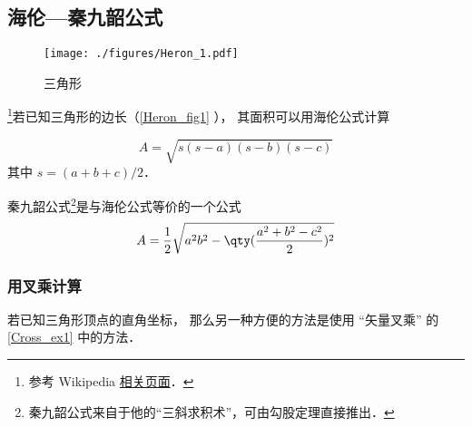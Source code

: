 

\subsection{海伦—秦九韶公式}
\begin{figure}[ht]
\centering
\texttt{[image: ./figures/Heron\_1.pdf]}
\caption{三角形} \label{Heron_fig1}
\end{figure}
\footnote{参考 Wikipedia \href{https://en.wikipedia.org/wiki/Heron's_formula}{相关页面}．}若已知三角形的边长（\autoref{Heron_fig1} ）， 其面积可以用海伦公式计算

\begin{equation}\label{Heron_eq1}
A = \sqrt{s(s-a)(s-b)(s-c)}
\end{equation}
其中 $s = (a+b+c)/2$．

秦九韶公式\footnote{秦九韶公式来自于他的“三斜求积术”，可由勾股定理直接推出．}是与海伦公式等价的一个公式
\begin{equation}
A = \frac{1}{2}\sqrt{a^2b^2-\qty(\frac{a^2+b^2-c^2}{2})^2}
\end{equation}

\subsubsection{用叉乘计算}
若已知三角形顶点的直角坐标， 那么另一种方便的方法是使用 “矢量叉乘” 的\autoref{Cross_ex1} 中的方法．

